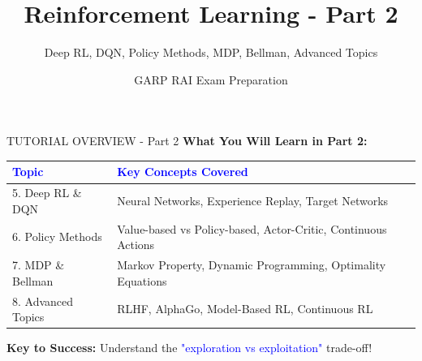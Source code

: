 \documentclass[8pt]{beamer}
\title{Reinforcement Learning - Part 2}
\subtitle{Deep RL, DQN, Policy Methods, MDP, Bellman, Advanced Topics}
\author{GARP RAI Exam Preparation}
\date{}
\begin{document}
\begin{frame}
\titlepage
\end{frame}


\begin{frame}{TUTORIAL OVERVIEW - Part 2}
\fontsize{7}{8}\selectfont
\textbf{What You Will Learn in Part 2:}

\vspace{0.2cm}
\begin{tabular}{|p{2.5cm}|p{5.5cm}|}
\hline
\textcolor{blue}{Topic} & \textcolor{blue}{Key Concepts Covered} \\
\hline
5. Deep RL \& DQN & Neural Networks, Experience Replay, Target Networks \\
\hline
6. Policy Methods & Value-based vs Policy-based, Actor-Critic, Continuous Actions \\
\hline
7. MDP \& Bellman & Markov Property, Dynamic Programming, Optimality Equations \\
\hline
8. Advanced Topics & RLHF, AlphaGo, Model-Based RL, Continuous RL \\
\hline
\end{tabular}

\vspace{0.2cm}
\textbf{Key to Success:} Understand the \textcolor{blue}{"exploration vs exploitation"} trade-off!
\end{frame}
\end{document}
